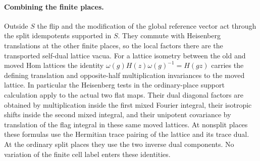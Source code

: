 \paragraph{Combining the finite places.}
Outside \(S\) the flip and the modification of the global
reference vector act through the split idempotents supported
in \(S\). They commute with Heisenberg translations at the
other finite places, so the local factors there are the
transported self-dual lattice vacua. For a lattice isometry
between the old and moved Hom lattices the identity
\(\omega(g)H(z)\omega(g)^{-1}=H(gz)\) carries the defining
translation and opposite-half multiplication invariances to
the moved lattice. In particular the Heisenberg tests in the
ordinary-place support calculation apply to the actual two
flat maps. Their dual diagonal factors are obtained by
multiplication inside the first mixed Fourier integral, their
isotropic shifts inside the second mixed integral, and their
unipotent covariance by translation of the flag integral in
these same moved lattices. At nonsplit places these formulas
use the Hermitian trace pairing of the lattice and its trace
dual. At the ordinary split places they use the two inverse
dual components. No variation of the finite cell label enters
these identities.

